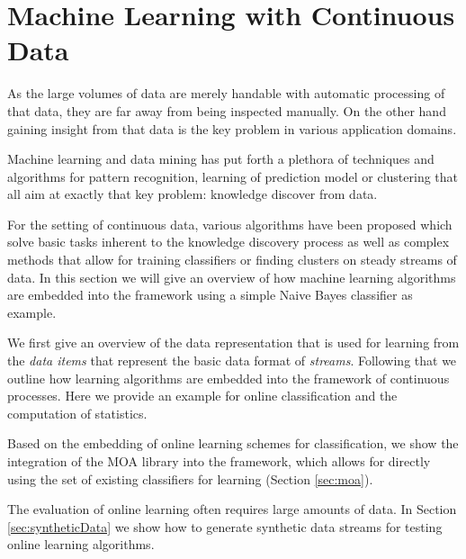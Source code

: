 \clearpage
\section{\label{sec:machineLearning}Machine Learning with Continuous Data}
As the large volumes of data are merely handable with automatic
processing of that data, they are far away from being inspected
manually. On the other hand gaining insight from that data is the key
problem in various application domains.

Machine learning and data mining has put forth a plethora of
techniques and algorithms for pattern recognition, learning of
prediction model or clustering that all aim at exactly that key
problem: knowledge discover from data.

For the setting of continuous data, various algorithms have been
proposed which solve basic tasks inherent to the knowledge discovery
process as well as complex methods that allow for training classifiers
or finding clusters on steady streams of data. In this section we will
give an overview of how machine learning algorithms are embedded into
the \streams framework using a simple Naive Bayes classifier as example.

We first give an overview of the data representation that is used for
learning from the {\em data items} that represent the basic data format
of {\em streams}. Following that we outline how learning algorithms are
embedded into the framework of continuous processes. Here we provide an
example for online classification and the computation of statistics.

Based on the embedding of online learning schemes for classification,
we show the integration of the MOA library into the \streams
framework, which allows for directly using the set of existing
classifiers for learning (Section \ref{sec:moa}).


The evaluation of online learning often requires large amounts of data.
In Section \ref{sec:syntheticData} we show how to generate synthetic data
streams for testing online learning algorithms.

